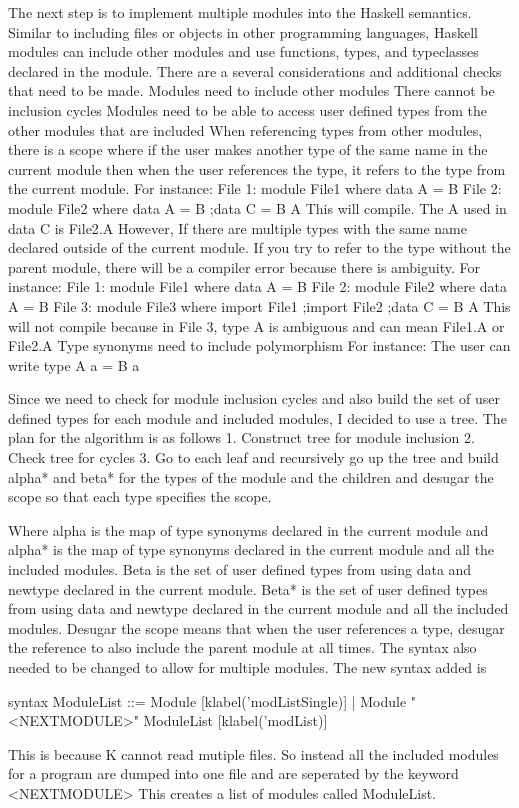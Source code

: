 The next step is to implement multiple modules into the Haskell semantics. Similar to including files or objects in other programming languages, Haskell modules can include other modules and use functions, types, and typeclasses declared in the module.
There are a several considerations and additional checks that need to be made.
Modules need to include other modules
There cannot be inclusion cycles
Modules need to be able to access user defined types from the other modules that are included
When referencing types from other modules, there is a scope where
if the user makes another type of the same name in the current module
then when the user references the type, it refers to the type from the current module.
For instance:
File 1:
module File1 where
{data A = B
}
File 2:
module File2 where
{data A = B
;data C = B A
}
	This will compile. The A used in data C is File2.A
However, If there are multiple types with the same name declared outside of the current module. If you try to refer to the type without the parent module, there will be a compiler error because there is ambiguity.
For instance:
File 1:
module File1 where
{data A = B
}
File 2:
module File2 where
{data A = B
}
File 3:
module File3 where
{import File1
;import File2
;data C = B A
}
	This will not compile because in File 3, type A is ambiguous and can mean File1.A or File2.A
Type synonyms need to include polymorphism
For instance:
	The user can write
	type A a = B a

Since we need to check for module inclusion cycles and also build the set of user defined types for each module and included modules, I decided to use a tree.
The plan for the algorithm is as follows
1. Construct tree for module inclusion
2. Check tree for cycles
3. Go to each leaf and recursively go up the tree and build alpha* and beta* for the types of the module and the children and desugar the scope so that each type specifies the scope.

Where alpha is the map of type synonyms declared in the current module and alpha* is the map of type synonyms declared in the current module and all the included modules. Beta is the set of user defined types from using data and newtype declared in the current module. Beta* is the set of user defined types from using data and newtype declared in the current module and all the included modules. 
Desugar the scope means that when the user references a type, desugar the reference to also include the parent module at all times.
The syntax also needed to be changed to allow for multiple modules. The new syntax added is

    syntax ModuleList ::= Module [klabel('modListSingle)] | Module "<NEXTMODULE>" ModuleList [klabel('modList)]

This is because K cannot read mutiple files. So instead all the included modules for a program are dumped into one file and are seperated by the keyword <NEXTMODULE>
This creates a list of modules called ModuleList.